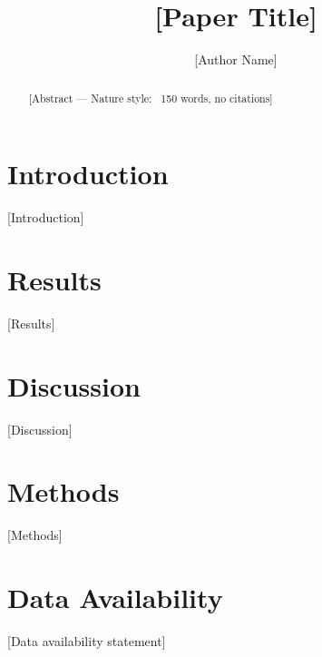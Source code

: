 \documentclass[11pt,a4paper]{article}
\title{[Paper Title]}
\author{[Author Name] \\ [Affiliation]}
\begin{document}
\maketitle

\begin{abstract}
[Abstract — Nature style: ~150 words, no citations]
\end{abstract}

\section{Introduction}
[Introduction]

\section{Results}
[Results]

\section{Discussion}
[Discussion]

\section{Methods}
[Methods]

\section{Data Availability}
[Data availability statement]



\end{document}
